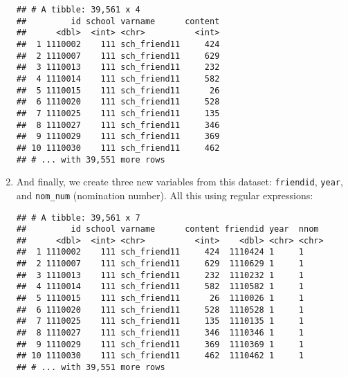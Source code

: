 \documentclass[]{book}
\newenvironment{Shaded}{\begin{snugshade}}{\end{snugshade}}
\newcommand{\KeywordTok}[1]{\textcolor[rgb]{0.13,0.29,0.53}{\textbf{#1}}}
\newcommand{\DataTypeTok}[1]{\textcolor[rgb]{0.13,0.29,0.53}{#1}}
\newcommand{\DecValTok}[1]{\textcolor[rgb]{0.00,0.00,0.81}{#1}}
\newcommand{\StringTok}[1]{\textcolor[rgb]{0.31,0.60,0.02}{#1}}
\newcommand{\OperatorTok}[1]{\textcolor[rgb]{0.81,0.36,0.00}{\textbf{#1}}}
\newcommand{\NormalTok}[1]{#1}
\theoremstyle{definition}
\theoremstyle{definition}
\theoremstyle{definition}
\theoremstyle{remark}
\begin{document}
\begin{enumerate}
\begin{verbatim}
## # A tibble: 39,561 x 4
##         id school varname      content
##      <dbl>  <int> <chr>          <int>
##  1 1110002    111 sch_friend11     424
##  2 1110007    111 sch_friend11     629
##  3 1110013    111 sch_friend11     232
##  4 1110014    111 sch_friend11     582
##  5 1110015    111 sch_friend11      26
##  6 1110020    111 sch_friend11     528
##  7 1110025    111 sch_friend11     135
##  8 1110027    111 sch_friend11     346
##  9 1110029    111 sch_friend11     369
## 10 1110030    111 sch_friend11     462
## # ... with 39,551 more rows
\end{verbatim}
\item
  And finally, we create three new variables from this dataset:
  \texttt{friendid}, \texttt{year}, and \texttt{nom\_num} (nomination
  number). All this using regular expressions:

\begin{Shaded}
\end{Shaded}

\begin{verbatim}
## # A tibble: 39,561 x 7
##         id school varname      content friendid year  nnom 
##      <dbl>  <int> <chr>          <int>    <dbl> <chr> <chr>
##  1 1110002    111 sch_friend11     424  1110424 1     1    
##  2 1110007    111 sch_friend11     629  1110629 1     1    
##  3 1110013    111 sch_friend11     232  1110232 1     1    
##  4 1110014    111 sch_friend11     582  1110582 1     1    
##  5 1110015    111 sch_friend11      26  1110026 1     1    
##  6 1110020    111 sch_friend11     528  1110528 1     1    
##  7 1110025    111 sch_friend11     135  1110135 1     1    
##  8 1110027    111 sch_friend11     346  1110346 1     1    
##  9 1110029    111 sch_friend11     369  1110369 1     1    
## 10 1110030    111 sch_friend11     462  1110462 1     1    
## # ... with 39,551 more rows
\end{verbatim}


\end{enumerate}
\end{document}
